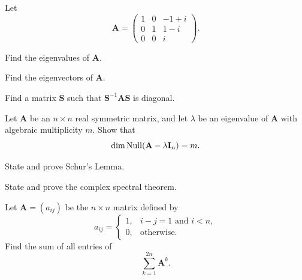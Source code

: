 \documentclass[11pt,oneside]{article}
\begin{document}
\begin{problem}
Let
\[
\mathbf A=
\begin{pmatrix}
1&0&-1+i\\
0&1&1-i\\
0&0&i
\end{pmatrix}.
\]
\begin{problemsubparts}
\item Find the eigenvalues of $\mathbf A$.
\item Find the eigenvectors of $\mathbf A$.
\item Find a matrix $\mathbf S$ such that $\mathbf S^{-1}\mathbf A\mathbf S$ is diagonal.
\end{problemsubparts}
\end{problem}

\begin{problem}
Let $\mathbf A$ be an $n\times n$ real symmetric matrix, and let $\lambda$ be an eigenvalue of $\mathbf A$ with algebraic multiplicity $m$. Show that
\[
\dim\operatorname{Null}(\mathbf A-\lambda\mathbf I_n)=m.
\]
\end{problem}

\begin{problem}
\begin{problemchoices}
\item State and prove Schur's Lemma.
\item State and prove the complex spectral theorem.
\end{problemchoices}
\end{problem}

\begin{problem}
Let $\mathbf A=(a_{ij})$ be the $n\times n$ matrix defined by
\[
a_{ij}=
\begin{cases}
1, & i-j=1\text{ and }i<n,\\
0, & \text{otherwise}.
\end{cases}
\]
Find the sum of all entries of
\[
\sum_{k=1}^{2n}\mathbf A^k.
\]
\end{problem}
\end{document}

